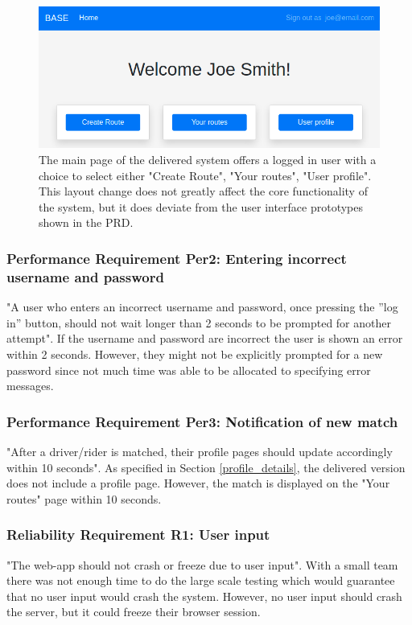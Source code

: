 \documentclass{article}
\begin{document}
\begin{figure}[h!]
    \centering
    \includegraphics[scale=0.5]{ssdFigures/joe_smith.png}
    \caption{The main page of the delivered system offers a logged in user with a choice to select either "Create Route", "Your routes", "User profile". This layout change does not greatly affect the core functionality of the system, but it does deviate from the user interface prototypes shown in the PRD.}
    \label{fig:main_page}
\end{figure}

\subsubsection{Performance Requirement Per2: Entering incorrect username and password}
"A user who enters an incorrect username and password, once pressing the ”log in” button, should not wait longer than 2 seconds to be prompted for another attempt"\cite{PRD}. If the username and password are incorrect the user is shown an error within 2 seconds. However, they might not be explicitly prompted for a new password since not much time was able to be allocated to specifying error messages.

\subsubsection{Performance Requirement Per3: Notification of new match}
"After a driver/rider is matched, their profile pages should update accordingly within 10 seconds"\cite{PRD}. As specified in Section \ref{profile_details}, the delivered version does not include a profile page. However, the match is displayed on the "Your routes" page within 10 seconds.

\subsubsection{Reliability Requirement R1: User input}
"The web-app should not crash or freeze due to user input"\cite{PRD}. With a small team there was not enough time to do the large scale testing which would guarantee that no user input would crash the system. However, no user input should crash the server, but it could freeze their browser session.
\end{document}
